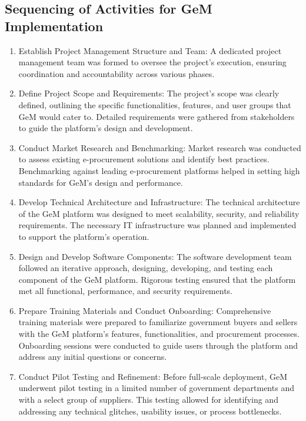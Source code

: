 \subsection{Sequencing of Activities for GeM Implementation}

\begin{enumerate}
    \item Establish Project Management Structure and Team: A dedicated project management team was formed to oversee the project's execution, ensuring coordination and accountability across various phases.
    
    \item Define Project Scope and Requirements: The project's scope was clearly defined, outlining the specific functionalities, features, and user groups that GeM would cater to. Detailed requirements were gathered from stakeholders to guide the platform's design and development.
    
    \item Conduct Market Research and Benchmarking: Market research was conducted to assess existing e-procurement solutions and identify best practices. Benchmarking against leading e-procurement platforms helped in setting high standards for GeM's design and performance.
    
    \item Develop Technical Architecture and Infrastructure: The technical architecture of the GeM platform was designed to meet scalability, security, and reliability requirements. The necessary IT infrastructure was planned and implemented to support the platform's operation.
    
    \item Design and Develop Software Components: The software development team followed an iterative approach, designing, developing, and testing each component of the GeM platform. Rigorous testing ensured that the platform met all functional, performance, and security requirements.
    
    \item Prepare Training Materials and Conduct Onboarding: Comprehensive training materials were prepared to familiarize government buyers and sellers with the GeM platform's features, functionalities, and procurement processes. Onboarding sessions were conducted to guide users through the platform and address any initial questions or concerns.
    
    \item Conduct Pilot Testing and Refinement: Before full-scale deployment, GeM underwent pilot testing in a limited number of government departments and with a select group of suppliers. This testing allowed for identifying and addressing any technical glitches, usability issues, or process bottlenecks.
    

\end{enumerate}
